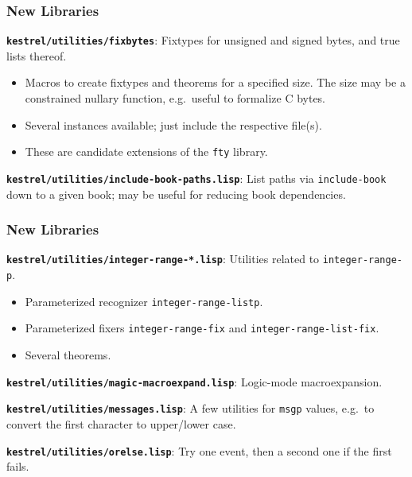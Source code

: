 \documentclass{beamer}
\newcommand{\code}[1]{\texttt{#1}}
\newcommand{\bookpath}[1]{\textbf{\code{#1}}}
\newcommand{\newlibtitle}{\frametitle{New Libraries}}
\newcommand{\separation}{\vspace*{1ex}}
\begin{document}

\begin{frame}

\newlibtitle

\bookpath{kestrel/utilities/fixbytes}:
Fixtypes for unsigned and signed bytes, and true lists thereof.
\begin{itemize}
\item
Macros to create fixtypes and theorems for a specified size.
The size may be a constrained nullary function,
e.g.\ useful to formalize C bytes.
\item
Several instances available; just include the respective file(s).
\item
These are candidate extensions of the \code{fty} library.
\end{itemize}

\separation

\bookpath{kestrel/utilities/include-book-paths.lisp}:
List paths via \code{include-book} down to a given book; may be useful
for reducing book dependencies.

\end{frame}


\begin{frame}

\newlibtitle

\bookpath{kestrel/utilities/integer-range-*.lisp}:
Utilities related to \code{integer-range-p}.
\begin{itemize}
\item
Parameterized recognizer \code{integer-range-listp}.
\item
Parameterized fixers
\code{integer-range-fix} and \code{integer-range-list-fix}.
\item
Several theorems.
\end{itemize}

\separation

\bookpath{kestrel/utilities/magic-macroexpand.lisp}:
Logic-mode macroexpansion.

\separation

\bookpath{kestrel/utilities/messages.lisp}:
A few utilities for \code{msgp} values,
e.g.\ to convert the first character to upper/lower case.

\separation

\bookpath{kestrel/utilities/orelse.lisp}:
Try one event, then a second one if the first fails.

\end{frame}
\end{document}
